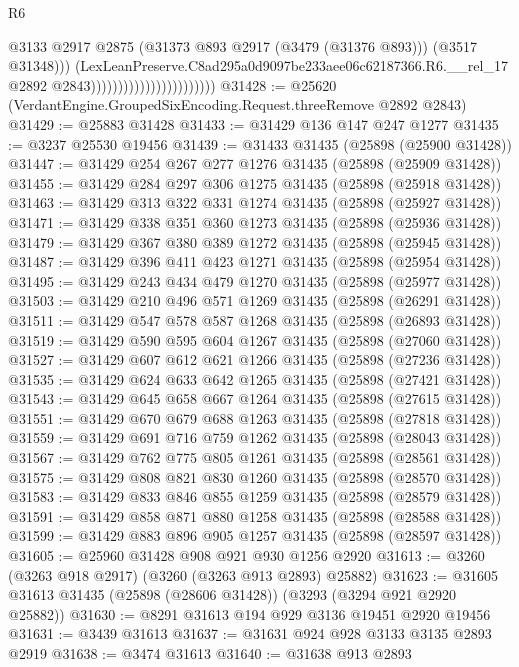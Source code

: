 \begin{lexlean}{R6}
\begin{coremodule}
                                                    @3133
                                                    @2917
                                                    @2875
                                                    (@31373 @893 @2917 (@3479 (@31376 @893)))
                                                    (@3517 @31348)))
                                                (LexLeanPreserve.C8ad295a0d9097be233aee06c62187366.R6.__rel_17
                                                  @2892
                                                  @2843)))))))))))))))))))))))
@31428 := @25620 (VerdantEngine.GroupedSixEncoding.Request.threeRemove @2892 @2843)
@31429 := @25883 @31428
@31433 := @31429 @136 @147 @247 @1277
@31435 := @3237 @25530 @19456
@31439 := @31433 @31435 (@25898 (@25900 @31428))
@31447 := @31429 @254 @267 @277 @1276 @31435 (@25898 (@25909 @31428))
@31455 := @31429 @284 @297 @306 @1275 @31435 (@25898 (@25918 @31428))
@31463 := @31429 @313 @322 @331 @1274 @31435 (@25898 (@25927 @31428))
@31471 := @31429 @338 @351 @360 @1273 @31435 (@25898 (@25936 @31428))
@31479 := @31429 @367 @380 @389 @1272 @31435 (@25898 (@25945 @31428))
@31487 := @31429 @396 @411 @423 @1271 @31435 (@25898 (@25954 @31428))
@31495 := @31429 @243 @434 @479 @1270 @31435 (@25898 (@25977 @31428))
@31503 := @31429 @210 @496 @571 @1269 @31435 (@25898 (@26291 @31428))
@31511 := @31429 @547 @578 @587 @1268 @31435 (@25898 (@26893 @31428))
@31519 := @31429 @590 @595 @604 @1267 @31435 (@25898 (@27060 @31428))
@31527 := @31429 @607 @612 @621 @1266 @31435 (@25898 (@27236 @31428))
@31535 := @31429 @624 @633 @642 @1265 @31435 (@25898 (@27421 @31428))
@31543 := @31429 @645 @658 @667 @1264 @31435 (@25898 (@27615 @31428))
@31551 := @31429 @670 @679 @688 @1263 @31435 (@25898 (@27818 @31428))
@31559 := @31429 @691 @716 @759 @1262 @31435 (@25898 (@28043 @31428))
@31567 := @31429 @762 @775 @805 @1261 @31435 (@25898 (@28561 @31428))
@31575 := @31429 @808 @821 @830 @1260 @31435 (@25898 (@28570 @31428))
@31583 := @31429 @833 @846 @855 @1259 @31435 (@25898 (@28579 @31428))
@31591 := @31429 @858 @871 @880 @1258 @31435 (@25898 (@28588 @31428))
@31599 := @31429 @883 @896 @905 @1257 @31435 (@25898 (@28597 @31428))
@31605 := @25960 @31428 @908 @921 @930 @1256 @2920
@31613 := @3260 (@3263 @918 @2917) (@3260 (@3263 @913 @2893) @25882)
@31623 := @31605 @31613 @31435 (@25898 (@28606 @31428)) (@3293 (@3294 @921 @2920 @25882))
@31630 := @8291 @31613 @194 @929 @3136 @19451 @2920 @19456
@31631 := @3439 @31613
@31637 := @31631 @924 @928 @3133 @3135 @2893 @2919
@31638 := @3474 @31613
@31640 := @31638 @913 @2893

\end{coremodule}
\end{lexlean}
